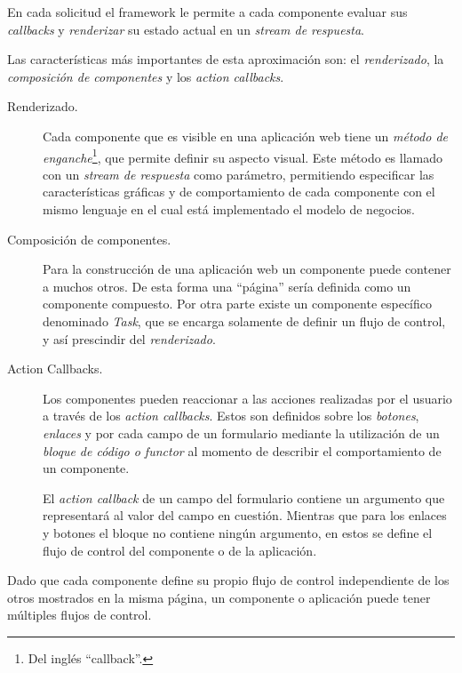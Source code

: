 En cada solicitud el framework le permite a cada componente evaluar sus \emph{callbacks} y \emph{renderizar} su estado actual en un \emph{stream de respuesta}.

Las características más importantes de esta aproximación son: el \emph{renderizado}, la \emph{composición de componentes} y los \emph{action callbacks}.

\begin{description}

\item[Renderizado.]

Cada componente que es visible en una aplicación web tiene un \emph{método de enganche}\footnote{Del inglés ``callback''.}, que permite definir su aspecto visual. Este método es llamado con un \emph{stream de respuesta} como parámetro, permitiendo especificar las características gráficas y de comportamiento de cada componente con el mismo lenguaje en el cual está implementado el modelo de negocios.

\item[Composición de componentes.]

Para la construcción de una aplicación web un componente puede contener a muchos otros. De esta forma una ``página'' sería definida como un componente compuesto. Por otra parte existe un componente específico denominado \emph{Task}, que se encarga solamente de definir un flujo de control, y así prescindir del \emph{renderizado}.

\item[Action Callbacks.]

Los componentes pueden reaccionar a las acciones realizadas por el usuario a través de los \emph{action callbacks}. Estos son definidos sobre los \emph{botones}, \emph{enlaces} y por cada campo de un formulario mediante la utilización de un \emph{bloque de código o functor} al momento de describir el comportamiento de un componente.

El \emph{action callback} de un campo del formulario contiene un argumento que representará al valor del campo en cuestión. Mientras que para los enlaces y botones el bloque no contiene ningún argumento, en estos se define el flujo de control del componente o de la aplicación.

\end{description}

Dado que cada componente define su propio flujo de control independiente de los otros mostrados en la misma página, un componente o aplicación puede tener múltiples flujos de control.

